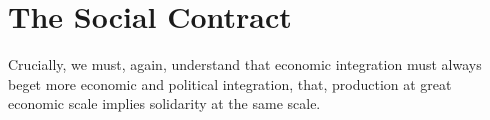 




\section{The Social Contract}


Crucially, we must, again, understand that economic integration must always beget more economic and political integration, that, production at great economic scale implies solidarity at the same scale.

